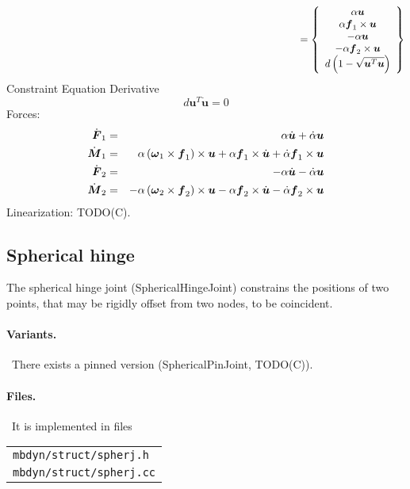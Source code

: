\documentclass[10pt,dvips,fleqn]{report}
\newcommand{\T}[1]{\boldsymbol{#1}}
\begin{document}
\begin{equation}
	\mbox{\hspace{100mm}} = \cubr{\cvvect{
		\alpha \T{u} \\
		\alpha \T{f}_1\times\T{u} \\
		-\alpha \T{u} \\
		-\alpha \T{f}_2\times\T{u} \\
		d\plbr{1 - \sqrt{\T{u}^T \T{u}}}
	}}
\end{equation}
Constraint Equation Derivative
\begin{equation}
	d \T{u}^T\dot{\T{u}} = 0
\end{equation}
Forces:
\begin{eqnarray}
	\dot{\T{F}}_1 & = &  \alpha \dot{\T{u}} + \dot{\alpha} \T{u} \\
	\dot{\T{M}}_1 & = & \alpha \plbr{\T{\omega}_1\times\T{f}_1} \times \T{u} 
		+ \alpha \T{f}_1 \times \dot{\T{u}}
		+ \dot{\alpha} \T{f}_1 \times \T{u} \\
	\dot{\T{F}}_2 & = & -\alpha \dot{\T{u}} - \dot{\alpha} \T{u} \\
	\dot{\T{M}}_2 & = & -\alpha \plbr{\T{\omega}_2 \times\T{f}_2} \times \T{u}
		- \alpha \T{f}_2 \times \dot{\T{u}}
		- \dot{\alpha} \T{f}_2 \times \T{u}
\end{eqnarray}
Linearization: TODO(C).





\subsection{Spherical hinge}
The spherical hinge joint (SphericalHingeJoint) constrains the positions
of two points, that may be rigidly offset from two nodes, to be coincident.

\paragraph{Variants.} \
There exists a pinned version (SphericalPinJoint, TODO(C)).

\paragraph{Files.} \
It is implemented in files

\begin{tabular}{l}
\texttt{mbdyn/struct/spherj.h} \\
\texttt{mbdyn/struct/spherj.cc}
\end{tabular}
\end{document}
